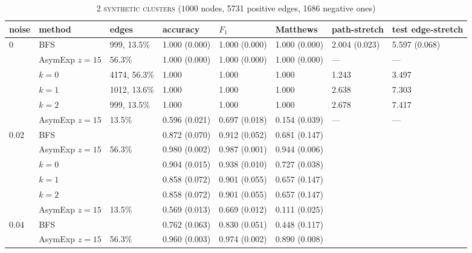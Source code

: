\documentclass[a4paper,final,notitlepage,11pt,svgnames]{scrartcl}
\begin{document}
\begin{table}[htpb]
	\centering
	\vspace*{-2em}
	\caption{\textsc{2 synthetic clusters} ($1000$ nodes, 5731 positive edges, 1686 negative ones) \label{tab:synth}}
	\begin{tabular}{llllllll}
		\toprule
		noise                     & method         & edges        & accuracy      & $F_1$         & Matthews       & path-stretch  & test edge-stretch \\
		\midrule
		\multirow{6}{*}{0}        & BFS            & 999, 13.5\%  & 1.000 (0.000) & 1.000 (0.000) & 1.000 (0.000)  & 2.004 (0.023) & 5.597 (0.068) \\
		& AsymExp $z=15$ & 56.3\%       & 1.000 (0.000) & 1.000 (0.000) & 1.000 (0.000)  & ---           & ---\\
		& $k=0$          & 4174, 56.3\% & 1.000         & 1.000         & 1.000          & 1.243         & 3.497 \\
		& $k=1$          & 1012, 13.6\% & 1.000         & 1.000         & 1.000          & 2.638         & 7.303 \\
		& $k=2$          & 999, 13.5\%  & 1.000         & 1.000         & 1.000          & 2.678         & 7.417 \\
		& AsymExp $z=15$ & 13.5\%       & 0.596 (0.021) & 0.697 (0.018) & 0.154 (0.039)  & ---           & ---\\
		\midrule
		\multirow{6}{*}{0.02}     & BFS            &              & 0.872 (0.070) & 0.912 (0.052) & 0.681 (0.147)  &               & \\
		& AsymExp $z=15$ & 56.3\%       & 0.980 (0.002) & 0.987 (0.001) & 0.944 (0.006)  &               & \\
		& $k=0$          &              & 0.904 (0.015) & 0.938 (0.010) & 0.727 (0.038)  &               & \\
		& $k=1$          &              & 0.858 (0.072) & 0.901 (0.055) & 0.657 (0.147)  &               & \\
		& $k=2$          &              & 0.858 (0.072) & 0.901 (0.055) & 0.657 (0.147)  &               & \\
		& AsymExp $z=15$ & 13.5\%       & 0.569 (0.013) & 0.669 (0.012) & 0.111 (0.025)  &               & \\
		\cmidrule(r){2-6}
		\multirow{6}{*}{0.04}     & BFS            &              & 0.762 (0.063) & 0.830 (0.051) & 0.448 (0.117)  &               & \\
		& AsymExp $z=15$ & 56.3\%       & 0.960 (0.003) & 0.974 (0.002) & 0.890 (0.008)  &               & \\

\end{tabular}
\end{table}
\end{document}

